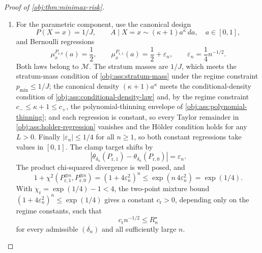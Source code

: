 \documentclass[11pt]{article}
\begin{document}
\begin{proof}[Proof of \cref{obj:thm:minimax-risk}]
\begin{enumerate}
\item For the parametric component, use the canonical design
\[
P(X=x)=1/J,
\qquad
A\mid X=x\sim (\kappa+1)a^\kappa\,da,
\quad a\in[0,1],
\]
and Bernoulli regressions
\[
\mu_{x}^{P_{\mathrm r,0}}(a)=\frac12,
\qquad
\mu_{x}^{P_{\mathrm r,1}}(a)=\frac12+\varepsilon_n,
\qquad
\varepsilon_n=\frac14 n^{-1/2}.
\]
Both laws belong to \(\mathcal M\).  The stratum masses are \(1/J\), which meets the stratum-mass condition of \cref{obj:ass:stratum-mass} under the regime constraint \(p_{\min}\le1/J\); the canonical density \((\kappa+1)a^\kappa\) meets the conditional-density condition of \cref{obj:ass:conditional-density-law} and, by the regime constraint \(c_-\le\kappa+1\le c_+\), the polynomial-thinning envelope of \cref{obj:ass:polynomial-thinning}; and each regression is constant, so every Taylor remainder in \cref{obj:ass:holder-regression} vanishes and the Hölder condition holds for any \(L>0\).  Finally \(|\varepsilon_n|\le1/4\) for all \(n\ge1\), so both constant regressions take values in \([0,1]\).
The clamp target shifts by
\[
\left|
\theta_{\delta_n}(P_{\mathrm r,1})
-
\theta_{\delta_n}(P_{\mathrm r,0})
\right|
=\varepsilon_n .
\]
The product chi-squared divergence is well posed, and
\[
1+\chi^2(P_{\mathrm r,1}^{\otimes n},P_{\mathrm r,0}^{\otimes n})
=
(1+4\varepsilon_n^2)^n
\le
\exp(n\,4\varepsilon_n^2)
=
\exp(1/4).
\]
With \(\chi_{\mathrm r}=\exp(1/4)-1<4\), the two-point mixture bound \((1+4\varepsilon_n^2)^n\le\exp(1/4)\) gives a constant
\(c_{\mathrm r}>0\), depending only on the regime constants, such that
\[
c_{\mathrm r}n^{-1/2}\le R_n^\star
\]
for every admissible \((\delta_n)\) and all sufficiently large \(n\).


\end{enumerate}
\end{proof}
\end{document}

